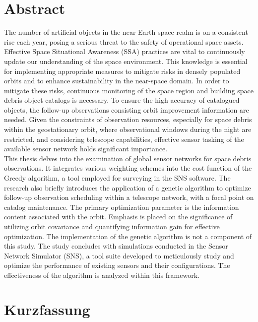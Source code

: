 \chapter*{Abstract}

The number of artificial objects in the near-Earth space realm is on a consistent rise each year,
posing a serious threat to the safety of operational space assets. Effective Space Situational Awareness (SSA) practices are vital to continuously update our understanding of the space environment.
This knowledge is essential for implementing appropriate measures to mitigate risks in densely
populated orbits and to enhance sustainability in the near-space domain. In order to mitigate these
risks, continuous monitoring of the space region and building space debris object catalogs is
necessary. To ensure the high accuracy of catalogued objects, the follow-up observations consisting
orbit improvement information are needed. Given the constraints of observation resources, especially for space debris within the geostationary orbit, where observational windows during the night
are restricted, and considering telescope capabilities, effective sensor tasking of the available sensor network
holds significant importance.\\

This thesis delves into the examination of global sensor networks for space debris observations. It integrates various weighting schemes into the cost function of 
the Greedy algorithm, a tool employed for surveying in the SNS software. The research also briefly introduces the application of a genetic algorithm to optimize follow-up observation 
scheduling within a telescope network, with a focal point on catalog maintenance. The primary optimization parameter is the information content associated with the orbit. 
Emphasis is placed on the significance of utilizing orbit covariance and quantifying information gain for effective optimization. The implementation of the genetic algorithm is not a component of this study.
The study concludes with simulations conducted in the Sensor Network Simulator (SNS), a tool suite developed to meticulously study and optimize the performance of existing sensors and their configurations. The effectiveness of the algorithm is analyzed within this framework.

\pagebreak

\chapter*{Kurzfassung}

